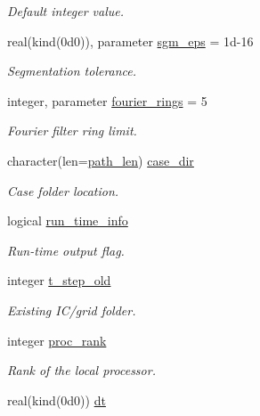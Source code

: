 \begin{DoxyCompactItemize}
\begin{DoxyCompactList}\small\item\em Default integer value. \end{DoxyCompactList}\item 
real(kind(0d0)), parameter \hyperlink{namespacem__global__parameters_aec97838cc58623019b07ae47da7f4c1c}{sgm\+\_\+eps} = 1d-\/16
\begin{DoxyCompactList}\small\item\em Segmentation tolerance. \end{DoxyCompactList}\item 
integer, parameter \hyperlink{namespacem__global__parameters_aadeb708160fdfee48fe55e83e41b5064}{fourier\+\_\+rings} = 5
\begin{DoxyCompactList}\small\item\em Fourier filter ring limit. \end{DoxyCompactList}\item 
character(len=\hyperlink{namespacem__global__parameters_aa9d578c318044b2f2ec990b5fc0dfab9}{path\+\_\+len}) \hyperlink{namespacem__global__parameters_a0b91e533fe3b3e112c42af4024014544}{case\+\_\+dir}
\begin{DoxyCompactList}\small\item\em Case folder location. \end{DoxyCompactList}\item 
logical \hyperlink{namespacem__global__parameters_a63e30bca2565699c008b6b0442ef5494}{run\+\_\+time\+\_\+info}
\begin{DoxyCompactList}\small\item\em Run-\/time output flag. \end{DoxyCompactList}\item 
integer \hyperlink{namespacem__global__parameters_a5d0554c4fef91acf46f683e8bcd29133}{t\+\_\+step\+\_\+old}
\begin{DoxyCompactList}\small\item\em Existing I\+C/grid folder. \end{DoxyCompactList}\item 
integer \hyperlink{namespacem__global__parameters_a383c6ff025d4ea09ddd4e2356042d86b}{proc\+\_\+rank}
\begin{DoxyCompactList}\small\item\em Rank of the local processor. \end{DoxyCompactList}\item 
real(kind(0d0)) \hyperlink{namespacem__global__parameters_a7fa880b937b54214312469a34268b883}{dt}

\end{DoxyCompactItemize}
